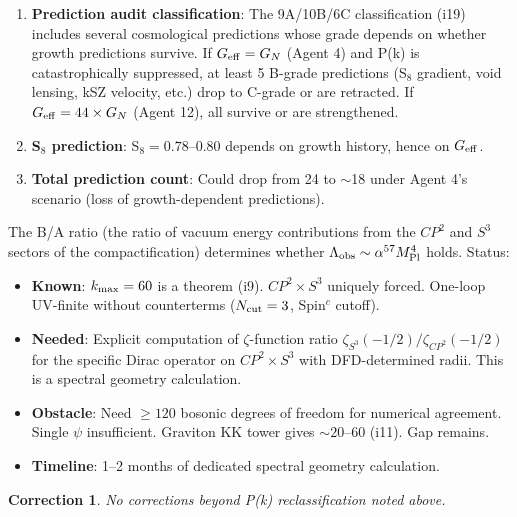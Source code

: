 \documentclass[11pt]{article}
\newcommand{\Geff}{G_{\rm eff}}
\newtheorem{correction}[theorem]{Correction}
\theoremstyle{remark}
\begin{document}
\begin{dependbox}[DEPENDS on $\Geff$ Resolution]
\begin{enumerate}
\item \textbf{Prediction audit classification}: The 9A/10B/6C classification (i19) includes
  several cosmological predictions whose grade depends on whether growth predictions
  survive. If $\Geff = G_N$ (Agent 4) and P(k) is catastrophically suppressed, at
  least 5 B-grade predictions (S$_8$ gradient, void lensing, kSZ velocity, etc.)
  drop to C-grade or are retracted. If $\Geff = 44 \times G_N$ (Agent 12), all survive
  or are strengthened.
\item \textbf{S$_8$ prediction}: S$_8 = 0.78$--$0.80$ depends on growth history, hence
  on $\Geff$.
\item \textbf{Total prediction count}: Could drop from 24 to $\sim$18 under Agent 4's
  scenario (loss of growth-dependent predictions).
\end{enumerate}
\end{dependbox}

\begin{newbox}
The B/A ratio (the ratio of vacuum energy contributions from the $CP^2$ and $S^3$
sectors of the compactification) determines whether $\Lambda_{\rm obs} \sim
\alpha^{57} M_{\rm Pl}^4$ holds. Status:
\begin{itemize}
\item \textbf{Known}: $k_{\rm max} = 60$ is a theorem (i9). $CP^2 \times S^3$ uniquely
  forced. One-loop UV-finite without counterterms ($N_{\rm cut} = 3$, Spin$^c$ cutoff).
\item \textbf{Needed}: Explicit computation of $\zeta$-function ratio
  $\zeta_{S^3}(-1/2)/\zeta_{CP^2}(-1/2)$ for the specific Dirac operator on
  $CP^2 \times S^3$ with DFD-determined radii. This is a spectral geometry calculation.
\item \textbf{Obstacle}: Need $\geq 120$ bosonic degrees of freedom for numerical agreement.
  Single $\psi$ insufficient. Graviton KK tower gives $\sim 20$--$60$ (i11). Gap remains.
\item \textbf{Timeline}: 1--2 months of dedicated spectral geometry calculation.
\end{itemize}
\end{newbox}

\begin{correction}
No corrections beyond P(k) reclassification noted above.
\end{correction}
\end{document}
